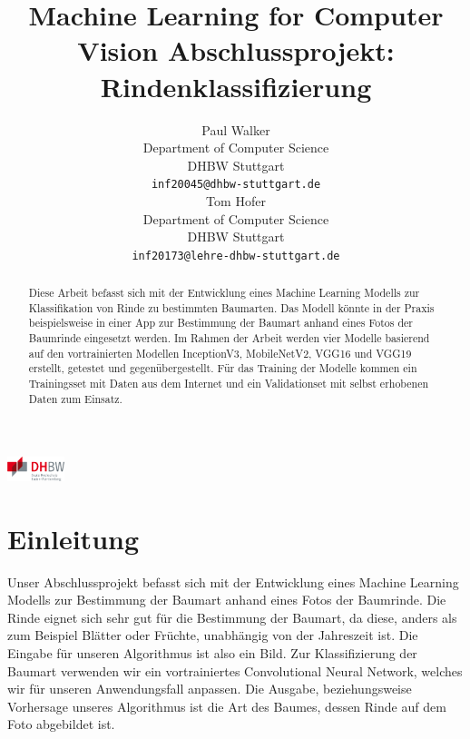 \documentclass{article}
\title{Machine Learning for Computer Vision Abschlussprojekt: Rindenklassifizierung}
\author{
  Paul Walker\\
  Department of Computer Science\\
  DHBW Stuttgart\\
  \texttt{inf20045@dhbw-stuttgart.de} \\
  \And
  Tom Hofer\\
  Department of Computer Science\\
  DHBW Stuttgart\\
  \texttt{inf20173@lehre-dhbw-stuttgart.de} \\
}
\begin{document}
\begin{center}
\includegraphics[height=0.7cm]{dhbw_logo.png}
\end{center}

\maketitle

\begin{abstract}
  Diese Arbeit befasst sich mit der Entwicklung eines Machine Learning Modells zur Klassifikation von Rinde zu bestimmten Baumarten. Das Modell könnte in der Praxis beispielsweise in einer App zur Bestimmung der Baumart anhand eines Fotos der Baumrinde eingesetzt werden. Im Rahmen der Arbeit werden vier Modelle basierend auf den vortrainierten Modellen InceptionV3, MobileNetV2, VGG16 und VGG19 erstellt, getestet und gegenübergestellt. Für das Training der Modelle kommen ein Trainingsset mit Daten aus dem Internet und ein Validationset mit selbst erhobenen Daten zum Einsatz.
\end{abstract}

\section{Einleitung}
Unser Abschlussprojekt befasst sich mit der Entwicklung eines Machine Learning Modells zur Bestimmung der Baumart anhand eines Fotos der Baumrinde. Die Rinde eignet sich sehr gut für die Bestimmung der Baumart, da diese, anders als zum Beispiel Blätter oder Früchte, unabhängig von der Jahreszeit ist. Die Eingabe für unseren Algorithmus ist also ein Bild. Zur Klassifizierung der Baumart verwenden wir ein vortrainiertes Convolutional Neural Network, welches wir für unseren Anwendungsfall anpassen. Die Ausgabe, beziehungsweise Vorhersage unseres Algorithmus ist die Art des Baumes, dessen Rinde auf dem Foto abgebildet ist.
\end{document}
